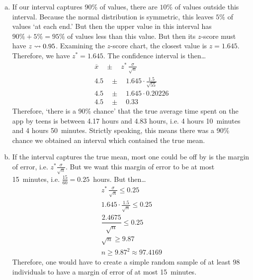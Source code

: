 \documentclass[12pt,letterpaper]{exam}
\begin{document}
\begin{questions}
\begin{enumerate}[(a)]
\item If our interval captures 90\% of values, there are $10\%$ of values outside this interval. Because the normal distribution is symmetric, this leaves $5\%$ of values `at each end.' But then the upper value in this interval has $90\% + 5\%= 95\%$ of values less than this value. But then its $z$-score must have $z \rightsquigarrow 0.95$. Examining the $z$-score chart, the closest value is $z= 1.645$. Therefore, we have $z^*= 1.645$. The confidence interval is then\dots
	\[
	\begin{gathered}
	\overline{x} \quad \pm \quad z^* \, \tfrac{\sigma}{\sqrt{n}} \\
	4.5 \quad \pm \quad 1.645 \cdot \tfrac{1.5}{\sqrt{55}} \\
	4.5 \quad \pm \quad 1.645 \cdot 0.20226 \\
	4.5 \quad \pm \quad 0.33
	\end{gathered}
	\]
Therefore, `there is a 90\% chance' that the true average time spent on the app by teens is between 4.17 hours and 4.83 hours, i.e. 4 hours 10~minutes and 4 hours 50~minutes. Strictly speaking, this means there was a 90\% chance we obtained an interval which contained the true mean.

\item If the interval captures the true mean, most one could be off by is the margin of error, i.e. $z^* \frac{\sigma}{\sqrt{n}}$. But we want this margin of error to be at most 15~minutes, i.e. $\frac{15}{60}= 0.25$~hours. But then\dots
	\[
	\begin{gathered}
	z^* \, \tfrac{\sigma}{\sqrt{n}} \leq 0.25 \\
	1.645 \cdot \tfrac{1.5}{\sqrt{n}} \leq 0.25 \\
	\dfrac{2.4675}{\sqrt{n}} \leq 0.25 \\
	\sqrt{n} \geq 9.87 \\
	n \geq 9.87^2 \approx 97.4169
	\end{gathered}
	\]
Therefore, one would have to create a simple random sample of at least $98$ individuals to have a margin of error of at most 15~minutes. 
\end{enumerate}




\end{questions}
\end{document}
